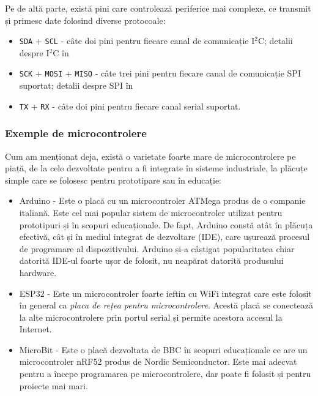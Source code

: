 Pe de altă parte, există pini care controlează periferice mai complexe, ce transmit și primesc date folosind diverse protocoale:

\begin{itemize}
  \item \texttt{SDA} + \texttt{SCL} - câte doi pini pentru fiecare canal de comunicație I$^2$C;
    detalii despre I$^2$C în 
  \item \texttt{SCK} + \texttt{MOSI} + \texttt{MISO} - câte trei pini pentru fiecare canal de comunicație SPI suportat;
    detalii despre SPI în 
  \item \texttt{TX} + \texttt{RX} - câte doi pini pentru fiecare canal serial suportat.
\end{itemize}

\subsubsection{Exemple de microcontrolere}
\label{sec:embed:micro-comp:micro:example}

Cum am menționat deja, există o varietate foarte mare de microcontrolere pe piață, de la cele dezvoltate pentru a fi integrate în sisteme industriale, la plăcuțe simple care se folosesc pentru prototipare sau în educație:

\begin{itemize}
  \item Arduino - Este o placă cu un microcontroler ATMega produs de o companie italiană.
    Este cel mai popular sistem de microcontroler utilizat pentru prototipuri și în scopuri educaționale.
    De fapt, Arduino constă atât în plăcuța efectivă, cât și în mediul integrat de dezvoltare (IDE), care ușurează procesul de programare al dispozitivului.
    Arduino și-a câștigat popularitatea chiar datorită IDE-ul foarte ușor de folosit, nu neapărat datorită produsului hardware.
  \item ESP32 - Este un microcontroler foarte ieftin cu WiFi integrat care este folosit în general ca \textit{placa de rețea pentru microcontrolere}.
    Acestă placă se conectează la alte microcontrolere prin portul serial și permite acestora accesul la Internet.
  \item MicroBit - Este o placă dezvoltata de BBC în scopuri educaționale ce are un microcontroler nRF52 produs de Nordic Semiconductor.
    Este mai adecvat pentru a începe programarea pe microcontrolere, dar poate fi folosit și pentru proiecte mai mari.
\end{itemize}

